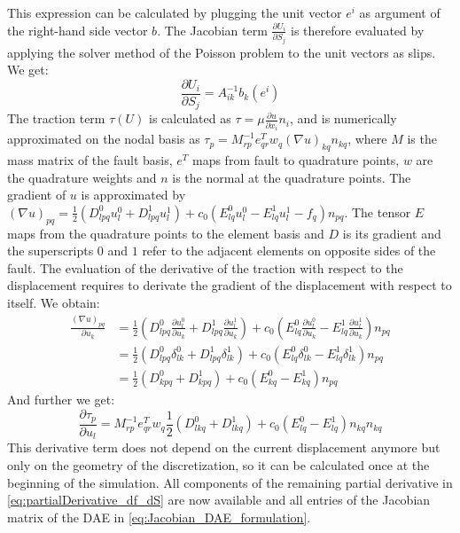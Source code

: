 \documentclass{report}
\begin{document}
This expression can be calculated by plugging the unit vector $e^i$ as argument of the right-hand side vector $b$. The Jacobian term $\frac{\partial U_i}{\partial S_j}$ is therefore evaluated by applying the solver method of the Poisson problem to the unit vectors as slips. We get:
\begin{equation}
	\frac{\partial U_i}{\partial S_j} = A_{ik}^{-1}b_k(e^i)
\end{equation}
The traction term $\tau(U)$ is calculated as $\tau = \mu \frac{\partial u}{\partial x_i}n_i$, and is numerically approximated on the nodal basis as $\tau_p = M_{rp}^{-1}e_{qr}^Tw_q(\nabla u)_{kq}n_{kq}$, where $M$ is the mass matrix of the fault basis, $e^T$ maps from fault to quadrature points, $w$ are the quadrature weights and $n$ is the normal at the quadrature points. The gradient of $u$ is approximated by $(\nabla u)_{pq} = \frac{1}{2}\left(D_{lpq}^0u_l^0 + D_{lpq}^1u_l^1\right) + c_0\left(E_{lq}^0u_l^0 - E_{lq}^1u_l^1 - f_q\right)n_{pq}$. The tensor $E$ maps from the quadrature points to the element basis and $D$ is its gradient and the superscripts $0$ and $1$ refer to the adjacent elements on opposite sides of the fault. The evaluation of the derivative of the traction with respect to the displacement requires to derivate the gradient of the displacement with respect to itself. We obtain: 
\begin{align}
\frac{(\nabla u)_{pq}}{\partial u_k} &= \frac{1}{2}\left(D_{lpq}^0\frac{\partial u_l^0}{\partial u_k} + D_{lpq}^1\frac{\partial u_l^1}{\partial u_k}\right) + c_0\left(E_{lq}^0\frac{\partial u_l^0}{\partial u_k} - E_{lq}^1\frac{\partial u_l^1}{\partial u_k}\right)n_{pq} \\
&= \frac{1}{2}\left(D_{lpq}^0\delta_{lk}^0 + D_{lpq}^1\delta_{lk}^1\right) + c_0\left(E_{lq}^0\delta_{lk}^0 - E_{lq}^1\delta_{lk}^1\right)n_{pq} \\
&= \frac{1}{2}\left(D_{kpq}^0 + D_{kpq}^1\right) + c_0\left(E_{kq}^0 - E_{kq}^1\right)n_{pq} 
\end{align}
And further we get: 
\begin{equation}
\frac{\partial \tau_p}{\partial u_l} = M_{rp}^{-1}e_{qr}^Tw_q
\frac{1}{2}\left(D_{lkq}^0 + D_{lkq}^1\right) + c_0\left(E_{lq}^0 - E_{lq}^1\right)n_{kq}
n_{kq} 
\end{equation}
This derivative term does not depend on the current displacement anymore but only on the geometry of the discretization, so it can be calculated once at the beginning of the simulation. All components of the remaining partial derivative in \autoref{eq:partialDerivative_df_dS} are now available and all entries of the Jacobian matrix of the DAE in \autoref{eq:Jacobian_DAE_formulation}. \\
\end{document}
